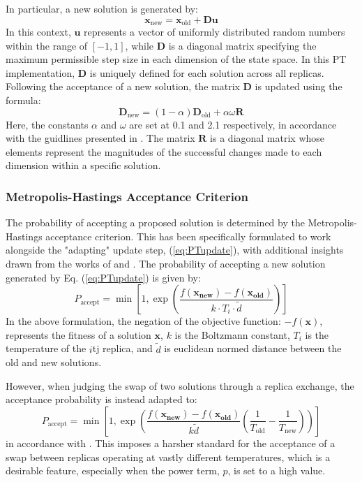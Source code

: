 \documentclass[10pt]{article}
\begin{document}
\begin{multicols}{2}
In particular, a new solution is generated by:
\begin{equation}
\mathbf{x}_{\text{new}} = \mathbf{x}_{\text{old}} + \mathbf{D}\mathbf{u}
\label{eq:PTupdate}
\end{equation}
In this context, $\mathbf{u}$ represents a vector of uniformly distributed random numbers within the range of $[-1, 1]$, while $\mathbf{D}$ is a diagonal matrix specifying the maximum permissible step size in each dimension of the state space. In this PT implementation, $\mathbf{D}$ is uniquely defined for each solution across all replicas. Following the acceptance of a new solution, the matrix $\mathbf{D}$ is updated using the formula:
\[
\mathbf{D}_{\text{new}} = (1-\alpha)\mathbf{D}_{\text{old}} + \alpha \omega \mathbf{R}
\]
Here, the constants $\alpha$ and $\omega$ are set at 0.1 and 2.1 respectively, in accordance with the guidlines presented in \cite{NT90-A34350}. The matrix $\mathbf{R}$ is a diagonal matrix whose elements represent the magnitudes of the successful changes made to each dimension within a specific solution.

\subsubsection{Metropolis-Hastings Acceptance Criterion}
\label{sec:PT_MA}

The probability of accepting a proposed solution is determined by the Metropolis-Hastings acceptance criterion. This has been specifically formulated to work alongside the "adapting" update step, (\ref{eq:PTupdate}), with additional insights drawn from the works of \cite{NT90-A34350} and \cite{Neal_1996}. The probability of accepting a new solution generated by Eq. (\ref{eq:PTupdate}) is given by:
\[
    P_{\text{accept}} = \min\left[1, \exp\left(\frac{f(\mathbf{x_{\text{new}}}) - f(\mathbf{x_{\text{old}}})}{k \cdot T_i \cdot \tilde{d}}\right)\right]
\]
In the above formulation, the negation of the objective function: $-f(\mathbf{x})$, represents the fitness of a solution $\mathbf{x}$, $k$ is the Boltzmann constant, $T_i$ is the temperature of the $i$tj replica, and $\tilde{d}$ is euclidean normed distance between the old and new solutions.

However, when judging the swap of two solutions through a replica exchange, the acceptance probability is instead adapted to:
\[
    P_{\text{accept}} = \min\left[1, \exp\left(\frac{f(\mathbf{x_{\text{new}}}) - f(\mathbf{x_{\text{old}}})}{k \tilde{d}} \left(\frac{1}{T_{\text{old}}} - \frac{1}{T_{\text{new}}}\right)\right)\right]
\]
in accordance with \cite{Neal_1996}. This imposes a harsher standard for the acceptance of a swap between replicas operating at vastly different temperatures, which is a desirable feature, especially when the power term, $p$, is set to a high value.


\end{multicols}
\end{document}
